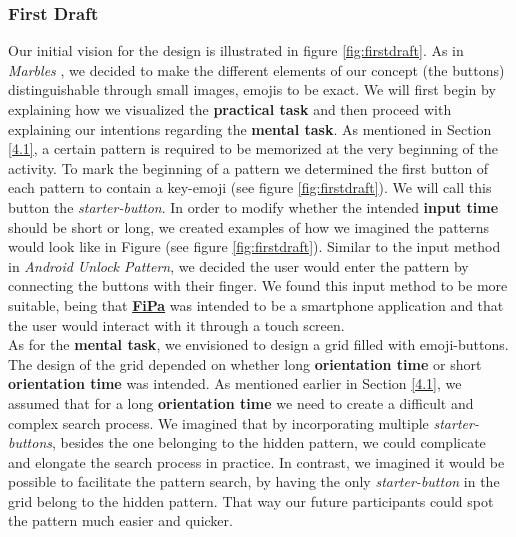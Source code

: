 \subsubsection{First Draft} \label{4.2.2.1}
Our initial vision for the design is illustrated in figure \ref{fig:firstdraft}. As in \textit{Marbles} \cite{patternRotation, anonymous}, we decided to make the different elements of our concept (the buttons) distinguishable through small images, emojis to be exact. We will first begin by explaining how we visualized the \textbf{practical task} and then proceed with explaining our intentions regarding the \textbf{mental task}. As mentioned in Section \ref{4.1}, a certain pattern is required to be memorized at the very beginning of the activity. To mark the beginning of a pattern we determined the first button of each pattern to contain a key-emoji (see figure \ref{fig:firstdraft}). We will call this button the \textit{starter-button}. In order to modify whether the intended \textbf{input time} should be short or long, we created examples of how we imagined the patterns would look like in Figure (see figure \ref{fig:firstdraft}). Similar to the input method in \textit{Android Unlock Pattern}, we decided the user would enter the pattern by connecting the buttons with their finger. We found this input method to be more suitable, being that \underline{\textbf{FiPa}} was intended to be a smartphone application and that the user would interact with it through a touch screen. \\

As for the \textbf{mental task}, we envisioned to design a grid filled with emoji-buttons. The design of the grid depended on whether long \textbf{orientation time} or short \textbf{orientation time} was intended. As mentioned earlier in Section \ref{4.1}, we assumed that for a long \textbf{orientation time} we need to create a difficult and complex search process. We imagined that by incorporating multiple \textit{starter-buttons}, besides the one belonging to the hidden pattern, we could complicate and elongate the search process in practice. In contrast, we imagined it would be possible to facilitate the pattern search, by having the only \textit{starter-button} in the grid belong to the hidden pattern. That way our future participants could spot the pattern much easier and quicker. 

